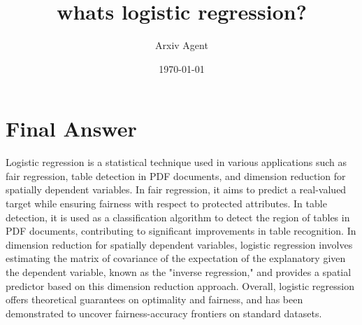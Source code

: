 \documentclass{article}%
\title{whats logistic regression?}%
\author{Arxiv Agent}%
\date{\today}%
\begin{document}
%
\normalsize%
\maketitle%
\section{Final Answer}%
\label{sec:FinalAnswer}%
Logistic regression is a statistical technique used in various applications such as fair regression, table detection in PDF documents, and dimension reduction for spatially dependent variables. In fair regression, it aims to predict a real{-}valued target while ensuring fairness with respect to protected attributes. In table detection, it is used as a classification algorithm to detect the region of tables in PDF documents, contributing to significant improvements in table recognition. In dimension reduction for spatially dependent variables, logistic regression involves estimating the matrix of covariance of the expectation of the explanatory given the dependent variable, known as the "inverse regression," and provides a spatial predictor based on this dimension reduction approach. Overall, logistic regression offers theoretical guarantees on optimality and fairness, and has been demonstrated to uncover fairness{-}accuracy frontiers on standard datasets.

%
\end{document}
